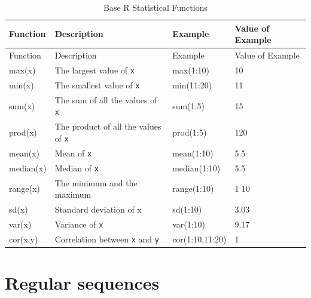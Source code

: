 \documentclass[
]{book}
\begin{document}
\begin{longtable}[]{@{}llll@{}}
\caption{\label{tab:statfuggvenyek2}Base R Statistical Functions}\tabularnewline
\toprule
Function & Description & Example & Value of Example\tabularnewline
\midrule
\endfirsthead
\toprule
Function & Description & Example & Value of Example\tabularnewline
\midrule
\endhead
{max(x)} & The largest value of \texttt{x} & {max(1:10)} & {10}\tabularnewline
{min(x)} & The smallest value of \texttt{x} & {min(11:20)} & {11}\tabularnewline
{sum(x)} & The sum of all the values of \texttt{x} & {sum(1:5)} & {15}\tabularnewline
{prod(x)} & The product of all the values of \texttt{x} & {prod(1:5)} & {120}\tabularnewline
{mean(x)} & Mean of \texttt{x} & {mean(1:10)} & {5.5}\tabularnewline
{median(x)} & Median of \texttt{x} & {median(1:10)} & {5.5}\tabularnewline
{range(x)} & The minimum and the maximum & {range(1:10)} & {1 10}\tabularnewline
{sd(x)} & Standard deviation of x & {sd(1:10)} & {3.03}\tabularnewline
{var(x)} & Variance of \texttt{x} & {var(1:10)} & {9.17}\tabularnewline
{cor(x,y)} & Correlation between \texttt{x} and \texttt{y} & {cor(1:10,11:20)} & {1}\tabularnewline
\bottomrule
\end{longtable}

\hypertarget{regular-sequences}{%
\section{Regular sequences}\label{regular-sequences}}
\end{document}
